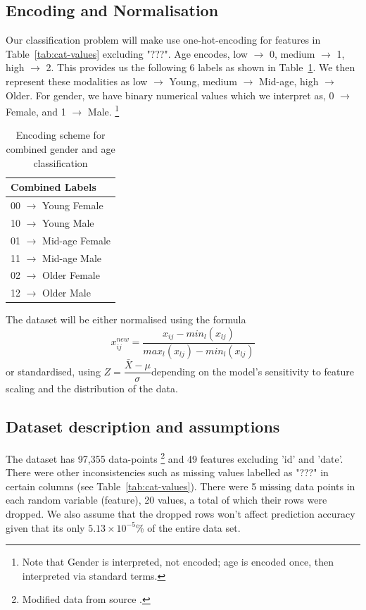 \documentclass[10pt,twocolumn]{article}
\begin{document}
\subsection{Encoding and Normalisation}
Our classification problem will make use one-hot-encoding for features in Table~\ref{tab:cat-values} excluding "???".  Age encodes,  low $\rightarrow$ 0, medium $\rightarrow$ 1, high $\rightarrow$ 2. This provides us the following 6 labels as shown in Table~\ref{tab:encoding-scheme}. 
We then represent these modalities as low $\rightarrow$ Young, medium $\rightarrow$ Mid-age, high $\rightarrow$ Older.
For gender, we have binary numerical values which we interpret as, 0 $\rightarrow$ Female, and 1 $\rightarrow$ Male. 
\footnote{Note that Gender is interpreted, not encoded; age is encoded once, then interpreted via standard terms.}
\begin{table}[H]
\centering
\caption{Encoding scheme for combined gender and age classification}
\begin{tabular}{|l|}
\hline
\textbf{Combined Labels} \\
\hline
00 $\rightarrow$ Young Female \\
10 $\rightarrow$ Young Male \\
01 $\rightarrow$ Mid-age Female \\
11 $\rightarrow$ Mid-age Male \\
02 $\rightarrow$ Older Female \\
12 $\rightarrow$ Older Male \\
\hline
\end{tabular}
\label{tab:encoding-scheme}
\end{table}
The dataset will be either normalised using the formula \begin{equation}x_{ij}^{new} = {\dfrac {x_{ij} - min_l{(x_{lj})}} {max_l{(x_{lj})} - min_l{(x_{lj})}}}\label{eq:minmax}
\end{equation} or standardised, using   $Z={\dfrac {\bar{X} - \mu} {\sigma}}$depending on the model's sensitivity to feature scaling and the distribution of the data.
\subsection{Dataset description and assumptions}
\label{subsec:dataset-description-and-assumptions}
The dataset has 97,355 data-points \footnote{Modified data from source \cite{dryad_tabletennis2021}.} and 49 features excluding 'id' and 'date'. There were other inconsistencies such as missing values labelled as "???" in certain columns (see Table~\ref{tab:cat-values}). There were 5 missing data points in each random variable (feature), 20 values, a total of which their rows were dropped. We also assume that the dropped rows won't affect prediction accuracy given that its only $5.13 \times 10^{-5}$\% of the entire data set.
\end{document}
